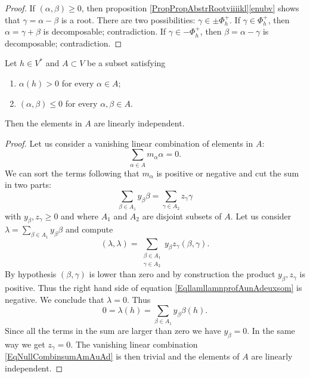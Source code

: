 \begin{proof}
    If \( (\alpha,\beta)\geq 0\), then proposition \ref{PropPropAbstrRootviiiikl}\ref{enubv} shows that \( \gamma=\alpha-\beta\) is a root. There are two possibilities: \( \gamma\in\pm\Phi^+_h\). If \( \gamma\in\Phi^+_h\), then \( \alpha=\gamma+\beta\) is decomposable; contradiction. If \( \gamma\in -\Phi^+_h\), then \( \beta=\alpha-\gamma\) is decomposable; contradiction.
\end{proof}

\begin{lemma}        \label{LemIndepAhVstar}
    Let \( h\in V^*\) and \( A\subset V\) be a subset satisfying
    \begin{enumerate}
        \item
            \( \alpha(h)>0\) for every \( \alpha\in A\);
        \item
            \( (\alpha,\beta)\leq 0\) for every \( \alpha,\beta\in A\).
    \end{enumerate}
    Then the elements in \( A\) are linearly independent.
\end{lemma}

\begin{proof}
    Let us consider a vanishing linear combination of elements in \( A\):
    \begin{equation}        \label{EqNullCombinsumAmAuAd}
        \sum_{\alpha\in A}m_{\alpha}\alpha=0.
    \end{equation}
    We can sort the terms following that \( m_{\alpha}\) is positive or negative and cut the sum in two parts:
    \begin{equation}
        \sum_{\beta\in A_1}y_{\beta}\beta=\sum_{\gamma\in A_2}z_{\gamma}\gamma
    \end{equation}
    with \( y_{\beta},z_{\gamma}\geq 0\) and where \( A_1\) and \( A_2\) are disjoint subsets of \( A\). Let us consider \( \lambda=\sum_{\beta\in A_1}y_{\beta}\beta\) and compute
    \begin{equation}        \label{EqllamllamnprofAunAdeuxsom}
        (\lambda,\lambda)=\sum_{\substack{\beta\in A_1\\\gamma\in A_2}}y_{\beta}z_{\gamma}(\beta,\gamma).
    \end{equation}
    By hypothesis \( (\beta,\gamma)\) is lower than zero and by construction the product \( y_{\beta},z_{\gamma}\) is positive. Thus the right hand side of equation \eqref{EqllamllamnprofAunAdeuxsom} is negative. We conclude that \( \lambda=0\). Thus
    \begin{equation}
        0=\lambda(h)=\sum_{\beta\in A_1}y_{\beta}\beta(h).
    \end{equation}
    Since all the terms in the sum are larger than zero we have \( y_{\beta}=0\). In the same way we get \( z_{\gamma}=0\). The vanishing linear combination \eqref{EqNullCombinsumAmAuAd} is then trivial and the elements of \( A\) are linearly independent.
\end{proof}

